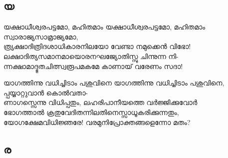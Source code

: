 \subsection{യ}

\begin{enumerate}

\begin{slokam}{\VSv}{\VNM}{യക്ഷാധീശ്വരപട്ടമോ, മഹിതമാം}
യക്ഷാധീശ്വരപട്ടമോ, മഹിതമാം സ്വാരാജ്യസാമ്രാജ്യമോ,\\
ത്ര്യക്ഷാദിത്രിദശാധികാരനിലയോ വേണ്ടാ നമുക്കെൻ വിഭോ!\\
ലക്ഷാദിത്യസമാനമായൊരനഘജ്യോതിസ്സു ചിന്നുന്ന നി-\\
ന്നക്ഷാമാദ്ഭുതചിത്സ്വരൂപമകമേ കാണായ്‌ വരേണം സദാ!
\end{slokam}


\begin{slokam}{\VSv}{\YK}{യാഗത്തിന്നു വധിച്ചിടാം പശുവിനെ}
യാഗത്തിന്നു വധിച്ചിടാം പശുവിനെ, പ്പയ്യാറ്റുവാൻ കൊൽവതാ-\\
ണാഗസ്സെന്നു വിധിപ്പതും, ലഹരിപാനീയത്തെ വർജ്ജിക്കുവോർ\\
ഭോഗത്താൽ ക്രതുവേദിതന്നിലതിനെസ്സാധൂകരിക്കുന്നതും,\\
യോഗക്ഷേമവിധിജ്ഞരേ! വരമുനിപ്രോക്തങ്ങളെന്നോ മതം?
\end{slokam}




\end{enumerate}


\subsection{ര}

